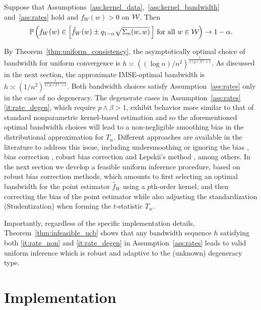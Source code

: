\begin{theorem}
  \label{thm:infeasible_ucb}

  Suppose that Assumptions~\ref{ass:kernel_data},~\ref{ass:kernel_bandwidth}
  and~\ref{ass:rates} hold and $f_W(w) > 0$ on $\mathcal{W}$. Then
  \begin{align*}
    \mathbb{P}\left(
      f_W(w) \in
      \left[ \hat f_W(w) \pm q_{1-\alpha} \sqrt{\Sigma_n(w,w)} \, \right]
      \, \textup{for all } w \in \mathcal{W}
    \right)
    \to 1 - \alpha.
  \end{align*}
\end{theorem}

By Theorem~\ref{thm:uniform_consistency}, the asymptotically optimal choice of
bandwidth for uniform convergence is
$h \asymp ((\log n)/n^2)^{\frac{1}{2(p \wedge \beta)+1}}$.
As discussed in the next section, the approximate
IMSE-optimal bandwidth is $h \asymp (1/n^2)^{\frac{1}{2(p \wedge \beta)+1}}$.
Both bandwidth choices satisfy Assumption~\ref{ass:rates} only in the case of
no degeneracy. The degenerate cases in
Assumption~\ref{ass:rates}\ref{it:rate_degen}, which require
$p \wedge \beta > 1$, exhibit behavior more similar to that of standard
nonparametric kernel-based estimation and so the aforementioned optimal
bandwidth choices will lead to a non-negligible smoothing bias in the
distributional approximation for $T_n$. Different approaches are available in
the literature to address this issue, including undersmoothing or ignoring the
bias \citep{hall2001bootstrapping}, bias correction \citep{hall1992effect},
robust bias correction \citep{calonico2018effect, calonico2022coverage} and
Lepskii's method
\citep{lepskii1992asymptotically,birge2001alternative}, among others. In the
next section we develop a feasible uniform inference procedure, based on robust
bias correction methods, which amounts to first selecting an optimal bandwidth
for the point estimator $\hat{f}_W$ using a $p$th-order kernel, and then
correcting the bias of the point estimator while also adjusting the
standardization (Studentization) when forming the $t$-statistic $T_n$.

Importantly, regardless of the specific implementation details,
Theorem~\ref{thm:infeasible_ucb} shows that any bandwidth sequence $h$
satisfying both \ref{it:rate_non} and \ref{it:rate_degen}
in Assumption~\ref{ass:rates} leads to valid uniform inference which is robust
and adaptive to the (unknown) degeneracy type.

\section{Implementation}\label{sec:implementation}

